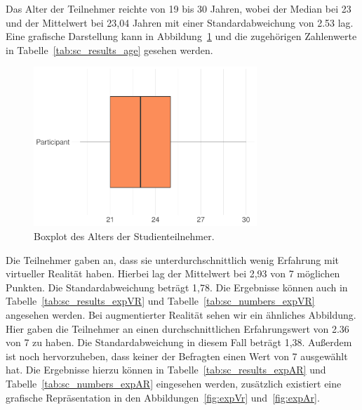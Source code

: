 Das Alter der Teilnehmer reichte von 19 bis 30 Jahren, wobei der Median bei 23 und der Mittelwert bei 23,04 Jahren mit einer Standardabweichung von 2.53 lag. Eine grafische Darstellung kann in Abbildung~\ref{fig:age} und die zugehörigen Zahlenwerte in Tabelle~\ref{tab:sc_results_age} gesehen werden.

\begin{figure}[H]
	\centering
	\includegraphics[width=0.75\textwidth]{./_StudyResults/age}
	\caption{Boxplot des Alters der Studienteilnehmer.}
	\label{fig:age}
\end{figure}

Die Teilnehmer gaben an, dass sie unterdurchschnittlich wenig Erfahrung mit virtueller Realität haben. Hierbei lag der Mittelwert bei 2,93 von 7 möglichen Punkten. Die Standardabweichung beträgt 1,78. Die Ergebnisse können auch in Tabelle~\ref{tab:sc_results_expVR} und Tabelle~\ref{tab:sc_numbers_expVR} angesehen werden. Bei augmentierter Realität sehen wir ein ähnliches Abbildung. Hier gaben die Teilnehmer an einen durchschnittlichen Erfahrungswert von 2.36 von 7 zu haben. Die Standardabweichung in diesem Fall beträgt 1,38. Außerdem ist noch hervorzuheben, dass keiner der Befragten einen Wert von 7 ausgewählt hat. Die Ergebnisse hierzu können in Tabelle~\ref{tab:sc_results_expAR} und Tabelle~\ref{tab:sc_numbers_expAR} eingesehen werden, zusätzlich existiert eine grafische Repräsentation in den Abbildungen~\ref{fig:expVr} und~\ref{fig:expAr}.


